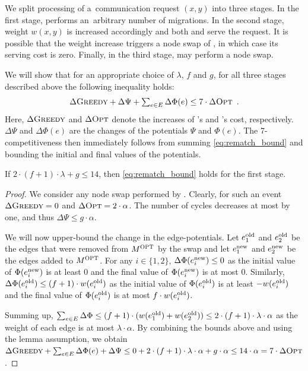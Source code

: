 We split processing of a~communication request $(x,y)$ into three stages. In
the first stage, \OPT performs an~arbitrary number of migrations. In the
second stage, weight $w(x,y)$ is increased accordingly and both \OPT and
\GREEDY serve the request. It is possible that the weight increase triggers a
node swap of \GREEDY, in which case its serving cost is zero. Finally, in the
third stage, \GREEDY may perform a node swap.

We will show that for an appropriate choice of $\lambda$, $f$ and $g$, for all
three stages described above the following inequality holds:
\begin{equation}
\label{eq:rematch_bound}
	\textstyle \Delta \textsc{Greedy} + \Delta \Psi + \sum_{e \in E} \Delta \Phi(e) \leq 7 \cdot \Delta \textsc{Opt} \enspace.
\end{equation}
Here, $\Delta \textsc{Greedy}$ and $\Delta \textsc{Opt}$ denote the increases of \GREEDY's and
\OPT's cost, respectively. $\Delta \Psi$ and $\Delta \Phi(e)$ are the changes
of the potentials $\Psi$ and $\Phi(e)$. The 7-competitiveness then immediately
follows from summing \eqref{eq:rematch_bound} and bounding the initial and
final values of the potentials. 

\begin{lemma}
\label{lem:opt_swap}
If $2 \cdot (f+1) \cdot \lambda + g \leq 14$, then \eqref{eq:rematch_bound}
holds for the first stage.
\end{lemma}

\begin{proof}
We consider any node swap performed by \OPT. Clearly, for such an event
$\Delta \textsc{Greedy} = 0$ and $\Delta \textsc{Opt} = 2 \cdot \alpha$. The number of cycles
decreases at most by one, and thus $\Delta \Psi \leq g \cdot \alpha$.

We will now upper-bound the change in the edge-potentials. Let $e^\textrm{old}_1$ and
$e^\textrm{old}_2$ be the edges that were removed from $M^\textsc{OPT}$ by the swap and let
$e^\textrm{new}_1$ and $e^\textrm{new}_2$ be the edges added to $M^\textsc{OPT}$. For any $i \in
\{1,2\}$, $\Delta \Phi(e^\textrm{new}_i) \leq 0$ as the initial value of
$\Phi(e^\textrm{new}_i)$ is at least $0$ and the final value of $\Phi(e^\textrm{new}_i)$ is at
most $0$. Similarly, $\Delta \Phi(e^\textrm{old}_i) \leq (f+1) \cdot w(e^\textrm{old}_i)$ as the
initial value of $\Phi(e^\textrm{old}_i)$ is at least $-w(e^\textrm{old}_i)$ and the final value
of $\Phi(e^\textrm{old}_i)$ is at most $f \cdot w(e^\textrm{old}_i)$.

Summing up, $\sum_{e \in E} \Delta \Phi \leq (f+1) \cdot (w(e^\textrm{old}_1) +
w(e^\textrm{old}_2)) \leq 2 \cdot (f+1) \cdot \lambda \cdot \alpha$ as the weight of each edge
is at most $\lambda \cdot \alpha$. By combining the bounds above and using the
lemma assumption, we obtain $\Delta \textsc{Greedy} + \sum_{e \in E} \Delta \Phi(e) +
\Delta \Psi \leq 0 + 2 \cdot (f+1) \cdot \lambda \cdot \alpha + g \cdot \alpha 
\leq 14 \cdot \alpha = 7 \cdot \Delta \textsc{Opt}$.
\end{proof}


